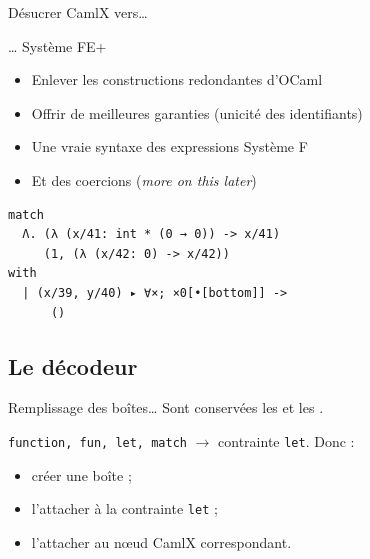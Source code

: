 \documentclass[final]{beamer}
\begin{document}
\begin{frame}[fragile]{Désucrer CamlX vers…}

… Système FE+

  \begin{itemize}
    \item Enlever les constructions redondantes d'OCaml
    \item Offrir de meilleures garanties (unicité des identifiants)
    \item Une vraie syntaxe des expressions Système F
    \item Et des coercions (\emph{more on this later})
  \end{itemize}

  \begin{verbatim}
match
  Λ. (λ (x/41: int * (0 → 0)) -> x/41)
     (1, (λ (x/42: 0) -> x/42))
with
  | (x/39, y/40) ▸ ∀×; ×0[•[bottom]] ->
      ()
  \end{verbatim}

\end{frame}

\subsection{Le décodeur}

\begin{frame}{Remplissage des boîtes…}
  Sont conservées les \underline{} et les
  \underline{}.

  \begin{center}
  \end{center}

  \texttt{function, fun, let, match} $\to$ contrainte \texttt{let}. Donc :
  \begin{itemize}
    \item créer une boîte ;
    \item l'attacher à la contrainte \texttt{let} ;
    \item l'attacher au nœud CamlX correspondant.
  \end{itemize}
\end{frame}
\end{document}
